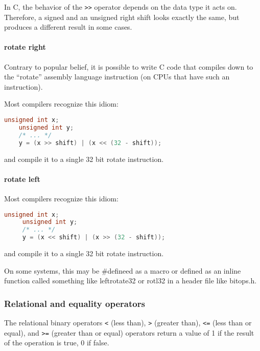 In C, the behavior of the \texttt{\textgreater{}\textgreater{}} operator
depends on the data type it acts on.  Therefore, a signed and an unsigned right
shift looks exactly the same, but produces a different result in some cases.

\paragraph{rotate right}
Contrary to popular belief, it is possible to write C code that compiles down
to the ``rotate'' assembly language instruction (on CPUs that have such an
instruction).

Most compilers recognize this idiom:

\lstset{basicstyle=\scriptsize, numbers=left, captionpos=b, tabsize=4}
\begin{lstlisting}[caption=Section \thesection listing \arabic{mathcnt},language={C},
breaklines=true,xleftmargin=15pt,label=lst:section\thesection listing\arabic{mathcnt}]
	unsigned int x;
	unsigned int y;
	/* ... */
	y = (x >> shift) | (x << (32 - shift));
\end{lstlisting}

and compile it to a single 32 bit rotate instruction.

\paragraph{rotate left}
Most compilers recognize this idiom:

\lstset{basicstyle=\scriptsize, numbers=left, captionpos=b, tabsize=4}
\begin{lstlisting}[caption=Section \thesection listing \arabic{mathcnt},language={C},
breaklines=true,xleftmargin=15pt,label=lst:section\thesection listing\arabic{mathcnt}]
	 unsigned int x;
	 unsigned int y;
	 /* ... */
	 y = (x << shift) | (x >> (32 - shift));
\end{lstlisting}

and compile it to a single 32 bit rotate instruction.

On some systems, this may be \#defineed as a macro or defined as an inline
function called something like leftrotate32 or rotl32 in a header file
like bitops.h.

\subsubsection{Relational and equality operators}
The relational binary operators \texttt{\textless{}} (less than),
\texttt{\textgreater{}} (greater than), \texttt{\textless{}=} (less than or
equal), and \texttt{\textgreater{}=} (greater than or equal) operators return a
value of 1 if the result of the operation is true, 0 if false.

